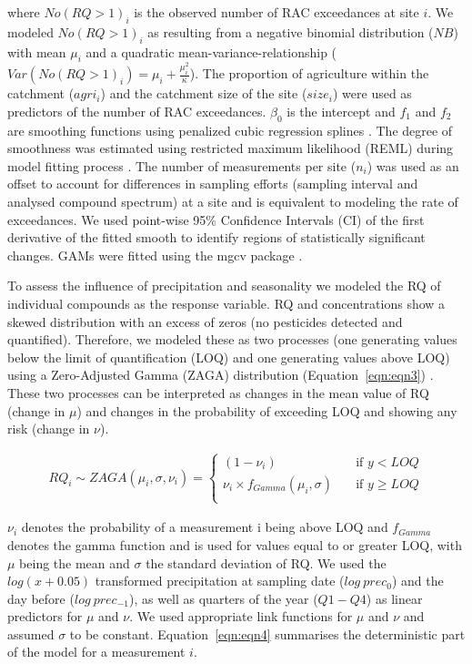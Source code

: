 \documentclass[journal=esthag,manuscript=article]{achemso}
\begin{document}
where $No(RQ > 1)_i$ is the observed number of RAC exceedances at site $i$. 
We modeled $No(RQ > 1)_i$ as resulting from a negative binomial distribution ($NB$) with mean $\mu_i$ and a quadratic mean-variance-relationship ($Var(No(RQ > 1)_i) = \mu_i + \frac{\mu_i^2}{\kappa}$).
The proportion of agriculture within the catchment ($agri_i$) and the catchment size of the site ($size_i$) were used as predictors of the number of RAC exceedances. 
$\beta_0$ is the intercept and $f_1$ and $f_2$ are smoothing functions using penalized cubic regression splines \citep{wood_generalized_2006}. 
The degree of smoothness was estimated using restricted maximum likelihood (REML) during model fitting process \citep{wood_fast_2011}.
The number of measurements per site ($n_i$) was used as an offset to account for differences in sampling efforts (sampling interval and analysed compound spectrum) at a site and is equivalent to modeling the rate of exceedances. 
We used point-wise 95\% Confidence Intervals (CI) of the first derivative of the fitted smooth to identify regions of statistically significant changes.
GAMs were fitted using the mgcv package \citep{wood_fast_2011}.

To assess the influence of precipitation and seasonality we modeled the RQ of individual compounds as the response variable.
RQ and concentrations show a skewed distribution with an excess of zeros (no pesticides detected and quantified). 
Therefore, we modeled these as two processes (one generating values below the limit of quantification (LOQ) and one generating values above LOQ) using a Zero-Adjusted Gamma (ZAGA) distribution (Equation~\ref{eqn:eqn3}) \cite{rigby_generalized_2005,stasinopoulos_gamlss.dist:_2016}.
These two processes can be interpreted as changes in the mean value of RQ (change in $\mu$) and changes in the probability of exceeding LOQ and showing any risk (change in $\nu$).

\begin{align}
RQ_i \sim ZAGA(\mu_i, \sigma, \nu_i) = 
  \begin{cases}
    (1 - \nu_i)   & \quad  \text{if } y < LOQ \\
    \nu_i \times f_{Gamma} (\mu_i, \sigma) & \quad \text{if } y \ge LOQ \\
  \end{cases}
  \label{eqn:eqn3}
\end{align}

$\nu_i$ denotes the probability of a measurement i being above LOQ and $f_{Gamma}$ denotes the gamma function and is used for values equal to or greater LOQ, with $\mu$ being the mean and $\sigma$ the standard deviation of RQ.
We used the $log(x+0.05)$ transformed precipitation at sampling date ($log~prec_0$) and the day before ($log~prec_{-1}$), as well as quarters of the year ($Q1-Q4$) as linear predictors for $\mu$ and $\nu$. 
We used appropriate link functions for $\mu$ and $\nu$ and assumed $\sigma$ to be constant. 
Equation~\ref{eqn:eqn4} summarises the deterministic part of the model for a measurement $i$.
\end{document}
